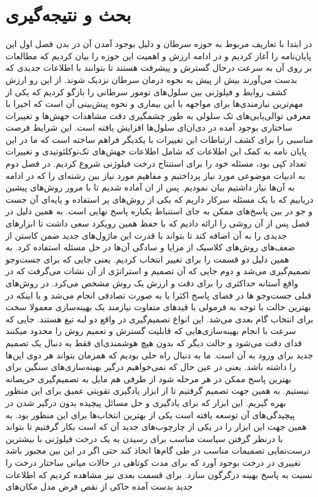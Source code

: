 
\chapter{بحث و نتیجه‌گیری}

در ابتدا با تعاریف مربوط به حوزه سرطان و دلیل بوجود آمدن آن در بدن فصل اول این پایان‌نامه را آغاز کردیم و در ادامه ارزش و اهمیت این حوزه را بیان کردیم که مطالعات بر روی آن به سرعت درحال گسترش و پیشرفت هستند تا بتوانند با اطلاعات جدیدی که بدست می‌آورند بیش از پیش به نحوه درمان سرطان نزدیک شوند. از این رو ارزش کشف روابط و فیلوژنی بین سلول‌های تومور سرطانی را بازگو کردیم که یکی از مهم‌ترین نیازمندی‌ها برای مواجهه با این بیماری و نحوه پیش‌بینی آن است که اخیرا با معرفی توالی‌یابی‌های تک سلولی به طور چشمگیری دقت مشاهدات جهش‌ها و تغییرات ساختاری بوجود آمده در دی‌ان‌ای سلول‌ها افزایش یافته است. این شرایط فرصت مناسبی را برای کشف ارتباطات این تغییرات با یکدیگر فراهم ساخته است که ما در این پایان نامه به کمک این اطلاعات که شامل اطلاعات جهش‌های تک‌نوکلئوتیدی و تغییرات تعداد کپی بود، مسئله خود را برای استنتاج درخت فیلوژنی شروع کردیم. در فصل دوم به ادبیات موضوعی مورد نیاز پرداختیم و مفاهیم مورد نیاز بین رشته‌ای را که در ادامه به آن‌ها نیاز داشتیم بیان نمودیم. پس از ان آماده شدیم تا با مرور روش‌های پیشین دریابیم که با یک مسئله  سرکار داریم که یکی از روش‌های پر استفاده و پایه‌ای آن جست و جو در بین پاسخ‌های ممکن به جای استنباط یکباره پاسخ نهایی است. به همین دلیل در فصل پس از آن روشی را ارائه دادیم که با حفظ همین رویکرد سعی داشت تا ابزارهای جدیدی را به آن اضافه کند تا بتواند با قدرت این ماژول‌های جدید ضمن کاستن از ضعف‌های روش‌های کلاسیک از مزایا و سادگی آن‌ها در حل مسئله استفاده کرد. به همین دلیل دو قسمت را برای تغییر انتخاب کردیم. یعنی جایی که برای جست‌وجو تصمیم‌گیری می‌شد و دوم جایی که آن تصمیم و استراتژی از آن نشات می‌گرفت که در واقع آستانه حداکثری را برای دقت و ارزش یک روش مشخص می‌کرد. در روش‌های قبلی جست‌و‌جو ها در فضای پاسخ اکثرا یا به صورت تصادفی انجام می‌شد و یا اینکه در بهترین حالت با توجه به فرمولی با قید‌های متفاوت نیازمند یک بهینه‌سازی معمولا سخت برای انتخاب گام بعدی می‌شد. این انواع تصمیم‌گیری در واقع دو لبه تیغ هستند. جایی که سرعت با انجام بهینه‌سازی‌هایی که قابلیت گسترش و تعمیم روش را محدود میکنند فدای دقت می‌شود و حالت دیگر که بدون هیچ هوشمند‌ی‌ای فقط به دنبال یک تصمیم جدید برای ورود به آن است. ما به دنبال راه حلی بودیم که همزمان بتواند هر دوی این‌ها را داشته باشد. یعنی در عین حال که نمی‌خواهیم درگیر بهینه‌سازی‌های سنگین برای بهترین پاسخ ممکن در هر مرحله شود از طرفی هم مایل به تصمیم‌گیری حریصانه نیستیم. به همین جهت تصمیم گرفتیم تا از ابزار یادگیری تقویتی عمیق برای این منظور بهره گیریم. این ابزار که برای یادگیری و حل مسائل پیچیده بدون درگیر شدن در پیچیدگی‌های آن توسعه یافته است یکی از بهترین انتخاب‌ها برای این منظور بود. به همین جهت این ابزار را در یکی از چارچوب‌های جدید آن که است بکار گرفتیم تا بتواند با درنظر گرفتن سیاست مناسب برای رسیدن به یک درخت فیلوژنی با بیشترین درست‌نمایی تصمیمات مناسب در طی گام‌ها اتخاذ کند حتی اگر در این بین مجبور باشد تغییری در درخت بوجود آورد که برای مدت کوتاهی در حالات میانی ساختار درخت را نسبت به پاسخ بهینه درگرگون سازد. برای قسمت بعدی نیز مشاهده کردیم که اطلاعات جدید بدست آمده حاکی از نقص فرض مدل مکان‌های 